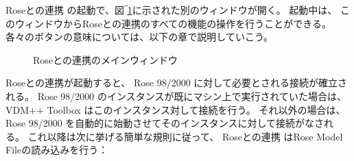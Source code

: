 \documentclass[\pformat,12pt]{jarticle}
\newcommand{\vdmpp}{VDM++}
\newcommand{\link}{Roseとの連携}
\newcommand{\rose}{Rose 98/2000}
\begin{document}
 \link{} の起動で、図‾\ref{fig:userinterface}に示された別のウィンドウが開く。
起動中は、 このウィンドウから\link{}のすべての機能の操作を行うことができる。
各々のボタンの意味については、以下の章で説明していこう。

\begin{figure}[htb]
\begin{center}
\mbox{}
\caption{\link{}のメインウィンドウ　\label{fig:userinterface}}
\end{center}
\end{figure}

\link{}が起動すると、 \rose{} に対して必要とされる接続が確立される。
 \rose{} のインスタンスが既にマシン上で実行されていた場合は、 \vdmpp{} Toolbox はこのインスタンス対して接続を行う。
それ以外の場合は、　\rose{} を自動的に始動させてそのインスタンスに対して接続がなされる。
これ以降は次に挙げる簡単な規則に従って、  \link{} はRose Model Fileの読み込みを行う：
\end{document}
